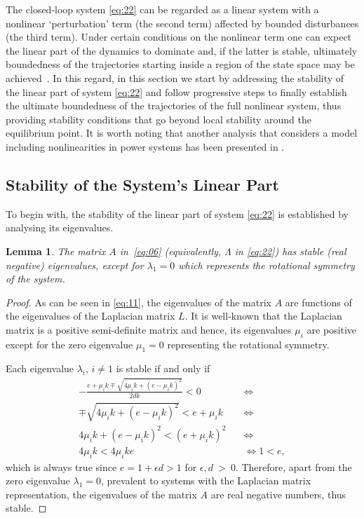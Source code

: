 \documentclass[letter, 10pt, conference]{ieeeconf}
\newtheorem{lemma}[theorem]{Lemma}
\newcommand{\1}{\mathbf{1}}
\newcommand{\0}{\mathbf{0}}
\begin{document}
{The closed-loop system \eqref{eq:22} can be regarded as a linear
system with a nonlinear `perturbation' term (the second term) affected
by bounded disturbances (the third term).  Under certain conditions on
the nonlinear term one can expect the linear part of the dynamics to
dominate and, if the latter is stable, ultimately boundedness of the
trajectories starting inside a region of the state space may be
achieved~\cite{Kha02}.
In this regard, in this section we start by addressing the stability
of the linear part of system \eqref{eq:22} and follow progressive
steps to finally establish the ultimate boundedness of the
trajectories of the full nonlinear system, thus providing stability
conditions that go beyond local stability around the equilibrium
point.
It is worth noting that another analysis that considers a model
including nonlinearities in power systems has been presented 
in \cite{siljak2004}.


\subsection{Stability of the System's Linear Part}
\label{subsec:LinSt}
To begin with, the stability of the linear part of
system \eqref{eq:22} is established by analysing its  eigenvalues.
\begin{lemma}
  \label{lem:A_eval}
  The matrix $A$ in~\eqref{eq:06} (equivalently, $\Lambda$ in
  \eqref{eq:22}) has stable (real negative) eigenvalues, except for
  $\lambda_1=0$ which represents the rotational symmetry of the
  system.
\end{lemma}


\begin{proof}
  As can be seen in \eqref{eq:11}, the eigenvalues of the matrix $A$
  are functions of the eigenvalues of the Laplacian matrix $L$. It is
  well-known that the Laplacian matrix is a positive semi-definite
  matrix and hence, its eigenvalues $\mu_i$ are positive except for
  the zero eigenvalue $\mu_1=0$ representing the rotational symmetry.
  
  Each eigenvalue $\lambda_i$, $i \ne 1$ is stable if and only if
  \begin{align*}
  	-\frac{e+\mu_i k \mp \sqrt{4\mu_i k + (e-\mu_i k)^2}}{2dk} <
        0 \quad &\iff \\
  	\mp \sqrt{4\mu_i k + (e-\mu_i k)^2} < e+\mu_i k \quad &\iff \\
  	4\mu_i k + (e-\mu_i k)^2 < (e+\mu_i k)^2 \quad &\iff \\
  	4\mu_i k < 4\mu_i k e \quad &\iff
  	1 < e ,
  \end{align*}
  which is always true since $e=1+\epsilon d >1$ for $\epsilon,d~>~0$.
  Therefore, apart from the zero eigenvalue $\lambda_1=0$, prevalent
  to systems with the Laplacian matrix representation, the eigenvalues of the matrix $A$ are real
  negative numbers, thus stable.
\end{proof}



}
\end{document}
